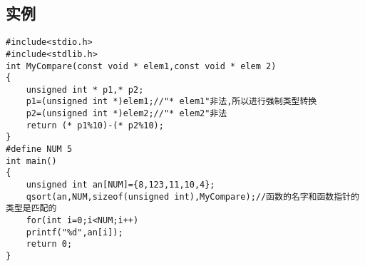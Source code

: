 \documentclass{article}
\begin{document}
\begin{CJK}{UTF8}{gbsn}
\section{实例}
\begin{verbatim}
#include<stdio.h>
#include<stdlib.h>
int MyCompare(const void * elem1,const void * elem 2)
{
	unsigned int * p1,* p2;
	p1=(unsigned int *)elem1;//"* elem1"非法,所以进行强制类型转换
	p2=(unsigned int *)elem2;//"* elem2"非法
	return (* p1%10)-(* p2%10);
}
#define NUM 5
int main()
{
	unsigned int an[NUM]={8,123,11,10,4};
	qsort(an,NUM,sizeof(unsigned int),MyCompare);//函数的名字和函数指针的类型是匹配的
	for(int i=0;i<NUM;i++)
	printf("%d",an[i]);
	return 0;
}
\end{verbatim}
\end{CJK}
\end{document}
